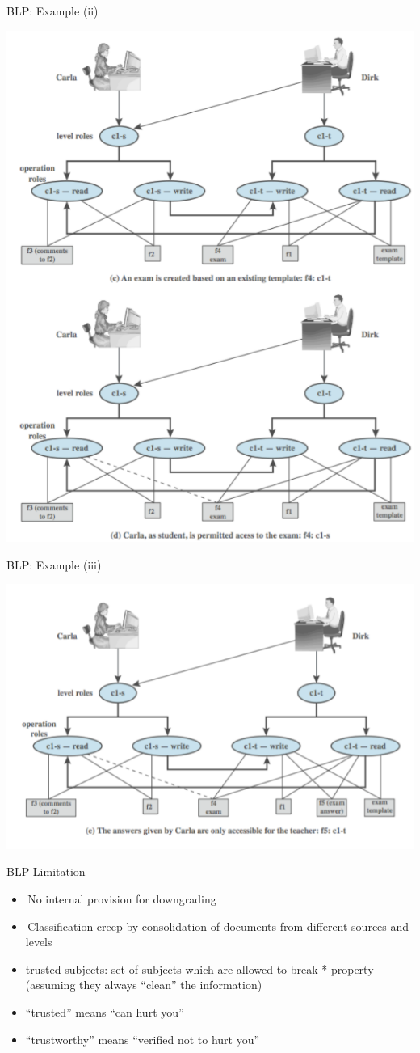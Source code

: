\documentclass{beamer}
\begin{document}
\begin{frame}{BLP: Example (ii)}
  \begin{center}
    \includegraphics[width=0.5\linewidth]{example2}
  \end{center}
\end{frame}

\begin{frame}{BLP: Example (iii)}
  \begin{center}
    \includegraphics[width=0.5\linewidth]{example3}
  \end{center}
\end{frame}

\begin{frame}{BLP Limitation}
  \begin{itemize}
    \item No internal provision for downgrading
    \item Classification creep by consolidation of 
      documents from different sources and levels
    \item \alert{trusted subjects}: set of subjects which are 
      allowed to break *-property (assuming they always 
      ``clean'' the information)
    \item ``trusted''  means ``can hurt you''
    \item ``trustworthy'' means ``verified not to hurt you''
  \end{itemize}
\end{frame}
\end{document}
